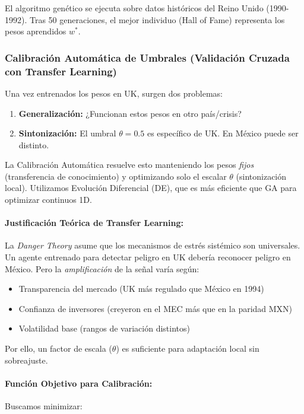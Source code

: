 El algoritmo genético se ejecuta sobre datos históricos del Reino Unido (1990-1992). Tras 50 generaciones, el mejor individuo (Hall of Fame) representa los pesos aprendidos $w^*$.

\subsubsection{Calibración Automática de Umbrales (Validación Cruzada con Transfer Learning)}

Una vez entrenados los pesos en UK, surgen dos problemas:
\begin{enumerate}
    \item \textbf{Generalización:} ¿Funcionan estos pesos en otro país/crisis?
    \item \textbf{Sintonización:} El umbral $\theta=0.5$ es específico de UK. En México puede ser distinto.
\end{enumerate}

\noindent
La Calibración Automática resuelve esto manteniendo los pesos \textit{fijos} (transferencia de conocimiento) y optimizando solo el escalar $\theta$ (sintonización local). Utilizamos Evolución Diferencial (DE), que es más eficiente que GA para optimizar continuos 1D.

\paragraph{Justificación Teórica de Transfer Learning:}
La \textit{Danger Theory} asume que los mecanismos de estrés sistémico son universales. Un agente entrenado para detectar peligro en UK debería reconocer peligro en México. Pero la \textit{amplificación} de la señal varía según:
\begin{itemize}
    \item Transparencia del mercado (UK más regulado que México en 1994)
    \item Confianza de inversores (creyeron en el MEC más que en la paridad MXN)
    \item Volatilidad base (rangos de variación distintos)
\end{itemize}

\noindent
Por ello, un factor de escala ($\theta$) es suficiente para adaptación local sin sobreajuste.

\paragraph{Función Objetivo para Calibración:}
Buscamos minimizar:

